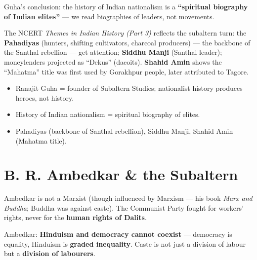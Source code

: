 \begin{KeyConcept}
Guha's conclusion: the history of Indian nationalism is a \textbf{``spiritual biography of Indian elites''} --- we read biographies of leaders, not movements.
\end{KeyConcept}

\begin{ExampleBox}
The NCERT \emph{Themes in Indian History (Part 3)} reflects the subaltern turn: the \textbf{Pahadiyas} (hunters, shifting cultivators, charcoal producers) --- the backbone of the Santhal rebellion --- get attention; \textbf{Siddhu Manji} (Santhal leader); moneylenders projected as ``Dekus'' (dacoits). \textbf{Shahid Amin} shows the ``Mahatma'' title was first used by Gorakhpur people, later attributed to Tagore.
\end{ExampleBox}

\begin{QuickRevision}
\begin{itemize}
\item Ranajit Guha = founder of Subaltern Studies; nationalist history produces heroes, not history.
\item History of Indian nationalism = spiritual biography of elites.
\item Pahadiyas (backbone of Santhal rebellion), Siddhu Manji, Shahid Amin (Mahatma title).
\end{itemize}
\end{QuickRevision}

\section{B. R. Ambedkar \& the Subaltern}

Ambedkar is not a Marxist (though influenced by Marxism --- his book \emph{Marx and Buddha}; Buddha was against caste). The Communist Party fought for workers' rights, never for the \textbf{human rights of Dalits}.

\begin{KeyConcept}
Ambedkar: \textbf{Hinduism and democracy cannot coexist} --- democracy is equality, Hinduism is \textbf{graded inequality}. Caste is not just a division of labour but a \textbf{division of labourers}.
\end{KeyConcept}

